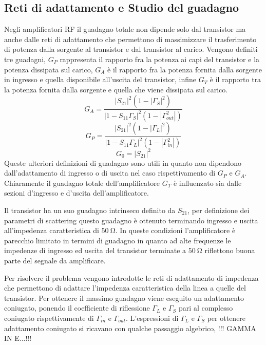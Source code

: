 \documentclass[12pt]{article}
\begin{document}
\subsection{Reti di adattamento e Studio del guadagno}
Negli amplificatori RF il guadagno totale non dipende solo dal transistor ma anche dalle reti di adattamento che permettono di massimizzare il trasferimento di potenza dalla sorgente al transistor e dal transistor al carico.
Vengono definiti tre guadagni, $G_P$ rappresenta il rapporto fra la potenza ai capi del transistor e la potenza dissipata sul carico,
$G_A$ è il rapporto fra la potenza fornita dalla sorgente in ingresso e quella disponibile all'uscita del transistor, infine $G_T$ è il rapporto tra la potenza fornita dalla sorgente e quella che viene dissipata sul carico.
\begin{equation}
    G_A = \dfrac{\left|S_{21}\right|^2\left(1-\left|\Gamma_{S}\right|^2\right)}{\left|1-S_{11}\Gamma_{S}\right|^2\left(1-\left|\Gamma_{out}^2\right|\right)}
\end{equation}
\begin{equation}
    G_P = \dfrac{\left|S_{21}\right|^2\left(1-\left|\Gamma_{L}\right|^2\right)}{\left|1-S_{11}\Gamma_{L}\right|^2\left(1-\left|\Gamma_{in}^2\right|\right)}
\end{equation}
\begin{equation}
    G_0 = \left|S_{21}\right|^2
\end{equation}
Queste ulteriori definizioni di guadagno sono utili in quanto non dipendono dall'adattamento di ingresso o di uscita nel caso rispettivamento di $G_P$ e $G_A$. Chiaramente il guadagno totale dell'amplificatore $G_T$ è influenzato sia dalle sezioni d'ingresso e d'uscita dell'amplificatore.

Il transistor ha un suo guadagno intrinseco definito da $S_{21}$, per definizione dei parametri di scattering questo guadagno è ottenuto terminando ingresso e uscita all'impedenza caratteristica di $\SI{50}{\ohm}$. In queste condizioni l'amplificatore è parecchio limitato in termini di guadagno in quanto ad alte frequenze le impedenze di ingresso ed uscita del transistor terminate a $\SI{50}{\ohm}$ riflettono buona parte del segnale da amplificare.

Per risolvere il problema vengono introdotte le reti di adattamento di impedenza che permettono di adattare l'impedenza caratteristica della linea a quelle del transistor. Per ottenere il massimo guadagno viene eseguito un adattamento coniugato, ponendo il coefficiente di riflessione $\Gamma_{L}$ e $\Gamma_{S}$ pari al complesso coniugato rispettivamente di $\Gamma_{in}$ e $\Gamma_{out}$. L'espressioni di $\Gamma_{L}$ e $\Gamma_{S}$ per ottenere adattamento coniugato si ricavano con qualche passaggio algebrico,
!!! GAMMA IN E...!!!
\end{document}
